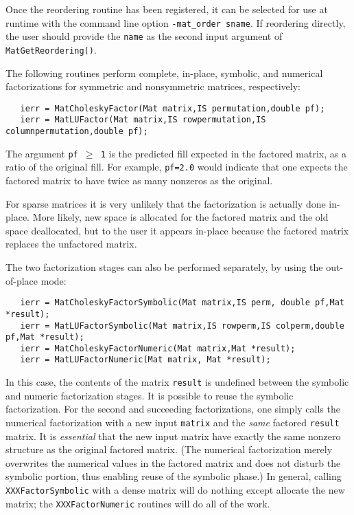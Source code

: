 {Once the reordering routine has been registered,
it can be selected for use at runtime with the
command line option {\tt -mat\_order sname}.  If reordering directly,
the user should provide the {\tt name} as the second input argument of
{\tt MatGetReordering()}.

The following routines perform complete, in-place, symbolic, and numerical 
factorizations for symmetric and nonsymmetric matrices, respectively:
\begin{verbatim}
   ierr = MatCholeskyFactor(Mat matrix,IS permutation,double pf);
   ierr = MatLUFactor(Mat matrix,IS rowpermutation,IS columnpermutation,double pf); 
\end{verbatim}
The argument {\tt pf $ \ge $ 1} is the predicted fill
expected in the factored matrix, as a ratio of the original fill. 
For example, {\tt pf=2.0} would indicate that one expects the factored
matrix to have twice as many nonzeros as the original.
 

For sparse matrices it is very unlikely that the factorization 
is actually done in-place. More likely, new space is allocated 
for the factored matrix and the old space deallocated, but to the 
user it appears in-place because the factored matrix replaces
the unfactored matrix.

The 
two  
factorization 
stages  
can also be performed separately, by using the out-of-place mode:
\begin{verbatim}
   ierr = MatCholeskyFactorSymbolic(Mat matrix,IS perm, double pf,Mat *result);
   ierr = MatLUFactorSymbolic(Mat matrix,IS rowperm,IS colperm,double pf,Mat *result);
   ierr = MatCholeskyFactorNumeric(Mat matrix,Mat *result);
   ierr = MatLUFactorNumeric(Mat matrix, Mat *result);
\end{verbatim}
In this case, the contents of the matrix {\tt result} is undefined between 
the symbolic and numeric factorization stages. 
It is possible to reuse the symbolic factorization. For the second and 
succeeding factorizations, one simply calls the numerical factorization with a 
new input {\tt matrix} and the {\em same} factored {\tt result} matrix.
It is {\em essential} that the new input matrix 
have   %
exactly the same nonzero structure as the original factored matrix.
(The numerical factorization merely overwrites the numerical values in the 
factored matrix and does not disturb the symbolic portion, thus enabling
reuse of the symbolic phase.)
In general, calling {\tt XXXFactorSymbolic} with a dense matrix will 
do nothing except allocate the new matrix; the {\tt XXXFactorNumeric} 
routines will do all of the work. 

}
